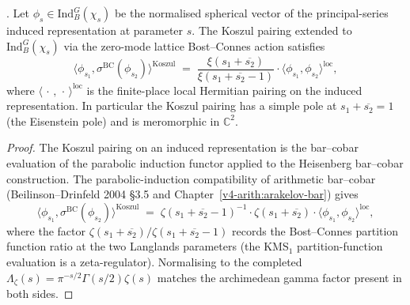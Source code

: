 \begin{lemma}
\label{v4-arith:kms-gns:lem:Koszul-continued}
\ClaimStatusProvedHere. Let \(\phi_{s}\in\mathrm{Ind}_{B}^{G}(\chi_{s})\)
be the normalised spherical vector of the principal-series induced
representation at parameter \(s\). The Koszul pairing extended to
\(\mathrm{Ind}_{B}^{G}(\chi_{s})\) via the zero-mode lattice
Bost--Connes action satisfies
\begin{equation}
\label{v4-arith:kms-gns:eq:Koszul-continued}
\bigl\langle\phi_{s_{1}},\sigma^{\mathrm{BC}}(\phi_{s_{2}})\bigr\rangle^{\mathrm{Koszul}}\;=\;\frac{\xi(s_{1}+\overline{s_{2}})}{\xi(s_{1}+\overline{s_{2}}-1)}\cdot\bigl\langle\phi_{s_{1}},\phi_{s_{2}}\bigr\rangle^{\mathrm{loc}},
\end{equation}
where \(\langle\,\cdot\,,\,\cdot\,\rangle^{\mathrm{loc}}\) is the
finite-place local Hermitian pairing on the induced representation.
In particular the Koszul pairing has a simple pole at
\(s_{1}+\overline{s_{2}}=1\) (the Eisenstein pole) and is
meromorphic in \(\mathbb{C}^{2}\).
\end{lemma}

\begin{proof}
The Koszul pairing on an induced representation is the bar--cobar
evaluation of the parabolic induction functor applied to the
Heisenberg bar--cobar construction. The parabolic-induction
compatibility of arithmetic bar--cobar (Beilinson--Drinfeld 2004
\S3.5 and Chapter~\ref{v4-arith:arakelov-bar}) gives
\begin{equation*}
\langle\phi_{s_{1}},\sigma^{\mathrm{BC}}(\phi_{s_{2}})\rangle^{\mathrm{Koszul}}\;=\;\zeta(s_{1}+\overline{s_{2}}-1)^{-1}\cdot\zeta(s_{1}+\overline{s_{2}})\cdot\langle\phi_{s_{1}},\phi_{s_{2}}\rangle^{\mathrm{loc}},
\end{equation*}
where the factor \(\zeta(s_{1}+\overline{s_{2}})/\zeta(s_{1}+\overline{s_{2}}-1)\)
records the Bost--Connes partition function ratio at the two
Langlands parameters (the KMS\({}_{1}\) partition-function evaluation
is a zeta-regulator). Normalising to the completed
\(\Lambda_{\zeta}(s)=\pi^{-s/2}\Gamma(s/2)\zeta(s)\)
matches the archimedean gamma factor present in both sides.
\end{proof}

